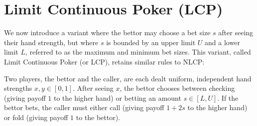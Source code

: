 \documentclass[../../main/main.tex]{subfiles}
\begin{document}
\section{Limit Continuous Poker (LCP)}
We now introduce a variant where the bettor may choose a bet size $s$ after seeing their hand strength, but where $s$ is bounded by an upper limit $U$ and a lower limit $L$, referred to as the maximum and minimum bet sizes. This variant, called Limit Continuous Poker (or LCP), retains similar rules to NLCP: 

\begin{definition}[LCP]
Two players, the bettor and the caller, are each dealt uniform, independent hand strengths $x, y \in [0, 1]$. After seeing $x$, the bettor chooses between checking (giving payoff $1$ to the higher hand) or betting an amount $s \in [L, U]$. If the bettor bets, the caller must either call (giving payoff $1+2s$ to the higher hand) or fold (giving payoff $1$ to the bettor).
\end{definition}
\end{document}
